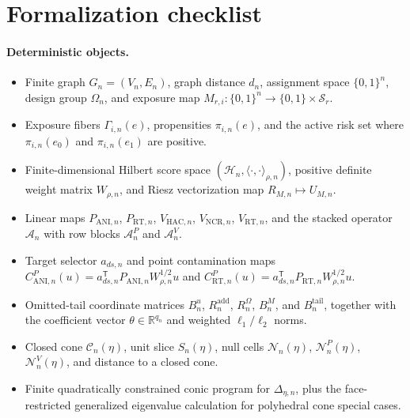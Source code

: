 \documentclass[11pt]{article}
\newcommand{\transpose}{\mathsf{T}}
\newcommand{\R}{\mathbb{R}}
\theoremstyle{definition}
\theoremstyle{plain}
\theoremstyle{remark}
\begin{document}
\section{Formalization checklist}
\paragraph{Deterministic objects.}
\begin{itemize}[leftmargin=*]
\item Finite graph \(G_n=(V_n,E_n)\), graph distance \(d_n\), assignment
space \(\{0,1\}^n\), design group \(\Omega_n\), and exposure map
\(M_{r,i}:\{0,1\}^n\to\{0,1\}\times\mathcal S_r\).
\item Exposure fibers \(\Gamma_{i,n}(e)\), propensities \(\pi_{i,n}(e)\), and
the active risk set where \(\pi_{i,n}(e_0)\) and \(\pi_{i,n}(e_1)\) are
positive.
\item Finite-dimensional Hilbert score space \((\mathcal H_n,\langle\cdot,
\cdot\rangle_{\rho,n})\), positive definite weight matrix \(W_{\rho,n}\), and
Riesz vectorization map \(R_{M,n}\mapsto U_{M,n}\).
\item Linear maps \(P_{\mathrm{ANI},n}\), \(P_{\mathrm{RT},n}\),
\(V_{\mathrm{HAC},n}\), \(V_{\mathrm{NCR},n}\), \(V_{\mathrm{RT},n}\), and the
stacked operator \(\mathcal A_n\) with row blocks \(\mathcal A^P_n\) and
\(\mathcal A^V_n\).
\item Target selector \(a_{ds,n}\) and point contamination maps
\(C^P_{\mathrm{ANI},n}(u)=
a_{ds,n}^{\transpose}P_{\mathrm{ANI},n}W_{\rho,n}^{1/2}u\) and
\(C^P_{\mathrm{RT},n}(u)=
a_{ds,n}^{\transpose}P_{\mathrm{RT},n}W_{\rho,n}^{1/2}u\).
\item Omitted-tail coordinate matrices \(B^u_n\),
\(R^{\mathrm{add}}_n\), \(R^\Omega_n\), \(B^M_n\), and
\(B^{\mathrm{tail}}_n\), together with the coefficient vector
\(\theta\in\R^{q_n}\) and weighted \(\ell_1/\ell_2\) norms.
\item Closed cone \(\mathcal C_n(\eta)\), unit slice \(S_n(\eta)\), null cells
\(\mathcal N_n(\eta)\), \(\mathcal N^P_n(\eta)\), \(\mathcal N^V_n(\eta)\),
and distance to a closed cone.
\item Finite quadratically constrained conic program for
\(\Delta_{\eta,n}\), plus the face-restricted generalized eigenvalue
calculation for polyhedral cone special cases.
\end{itemize}
\end{document}
